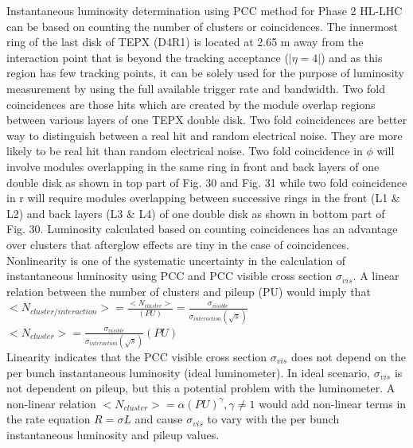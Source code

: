 Instantaneous luminosity determination using PCC method for Phase 2 HL-LHC can be based on counting the number of clusters or coincidences. The innermost ring of the last disk of TEPX (D4R1) is located at 2.65 m away from the interaction point that is beyond the tracking acceptance ($|\eta = 4|$) and as this region has few tracking points, it can be solely used for the purpose of luminosity measurement by using the full available trigger rate and bandwidth.  Two fold coincidences are those hits which are created by the module overlap regions between various layers of one TEPX double disk. Two fold coincidences are better way to distinguish between a real hit and random electrical noise. They are more likely to be real hit than random electrical noise. Two fold coincidence in $\phi$ will involve modules overlapping in the same ring in front and back layers of one double disk as shown in top part of Fig. 30 and Fig. 31 while two fold coincidence in r will require modules overlapping between successive rings in the front (L1 $\&$ L2) and back layers (L3 $\&$ L4) of one double disk as shown in bottom part of Fig. 30. Luminosity calculated based on counting coincidences has an advantage over clusters that afterglow effects are tiny in the case of coincidences.  \cite{Collaboration:2706512} \\


Nonlinearity is one of the systematic uncertainty in the calculation of instantaneous luminosity using PCC and PCC visible cross section $\sigma_{vis}$. A linear relation between the number of clusters and pileup (PU) would imply that\\

$<N_{cluster/interaction}> = \frac{<N_{cluster}>}{(PU)} = \frac{\sigma_{visible}}{\sigma_{interaction} (\sqrt{s})}$ \\

$<N_{cluster}> =  \frac{\sigma_{visible}}{\sigma_{interaction}(\sqrt{s})} (PU)$ \\

\newpage Linearity indicates that the PCC visible cross section $\sigma_{vis}$ does not depend on the per bunch instantaneous luminosity (ideal luminometer). In ideal  scenario, $\sigma_{vis}$ is not dependent on pileup, but this a potential problem with the luminometer. A non-linear relation $<N_{cluster}> = \alpha (PU)^{\gamma}, \gamma \neq 1$ would add non-linear terms in the rate equation $R = \sigma L$  and cause $\sigma_{vis}$ to vary with the per bunch instantaneous luminosity and pileup values.


